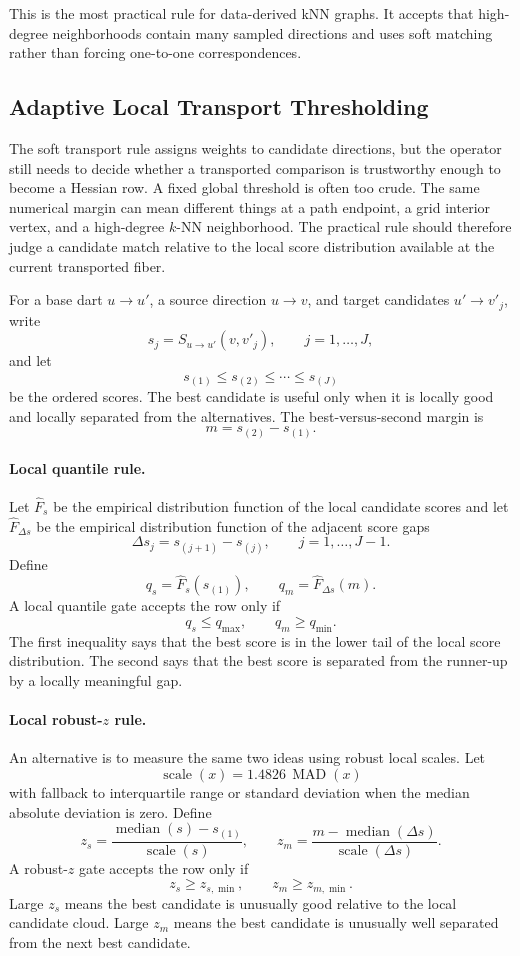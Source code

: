 \documentclass[11pt]{article}
\begin{document}
This is the most practical rule for data-derived kNN graphs.  It accepts that
high-degree neighborhoods contain many sampled directions and uses soft
matching rather than forcing one-to-one correspondences.

\subsection{Adaptive Local Transport Thresholding}

The soft transport rule assigns weights to candidate directions, but the
operator still needs to decide whether a transported comparison is trustworthy
enough to become a Hessian row.  A fixed global threshold is often too crude.
The same numerical margin can mean different things at a path endpoint, a grid
interior vertex, and a high-degree \(k\)-NN neighborhood.  The practical rule
should therefore judge a candidate match relative to the local score
distribution available at the current transported fiber.

For a base dart \(u\to u'\), a source direction \(u\to v\), and target
candidates \(u'\to v'_j\), write
\[
  s_j = S_{u\to u'}(v,v'_j),
  \qquad j=1,\ldots,J,
\]
and let
\[
  s_{(1)}\le s_{(2)}\le\cdots\le s_{(J)}
\]
be the ordered scores.  The best candidate is useful only when it is locally
good and locally separated from the alternatives.  The best-versus-second
margin is
\[
  m = s_{(2)}-s_{(1)}.
\]

\paragraph{Local quantile rule.}
Let \(\widehat F_s\) be the empirical distribution function of the local
candidate scores and let \(\widehat F_{\Delta s}\) be the empirical
distribution function of the adjacent score gaps
\[
  \Delta s_j=s_{(j+1)}-s_{(j)},\qquad j=1,\ldots,J-1.
\]
Define
\[
  q_s = \widehat F_s(s_{(1)}),
  \qquad
  q_m = \widehat F_{\Delta s}(m).
\]
A local quantile gate accepts the row only if
\[
  q_s\le q_{\max},
  \qquad
  q_m\ge q_{\min}.
\]
The first inequality says that the best score is in the lower tail of the
local score distribution.  The second says that the best score is separated
from the runner-up by a locally meaningful gap.

\paragraph{Local robust-\(z\) rule.}
An alternative is to measure the same two ideas using robust local scales.
Let
\[
  \operatorname{scale}(x)
  =
  1.4826\,\operatorname{MAD}(x)
\]
with fallback to interquartile range or standard deviation when the median
absolute deviation is zero.  Define
\[
  z_s
  =
  \frac{\operatorname{median}(s)-s_{(1)}}
       {\operatorname{scale}(s)},
  \qquad
  z_m
  =
  \frac{m-\operatorname{median}(\Delta s)}
       {\operatorname{scale}(\Delta s)}.
\]
A robust-\(z\) gate accepts the row only if
\[
  z_s\ge z_{s,\min},
  \qquad
  z_m\ge z_{m,\min}.
\]
Large \(z_s\) means the best candidate is unusually good relative to the local
candidate cloud.  Large \(z_m\) means the best candidate is unusually well
separated from the next best candidate.
\end{document}
